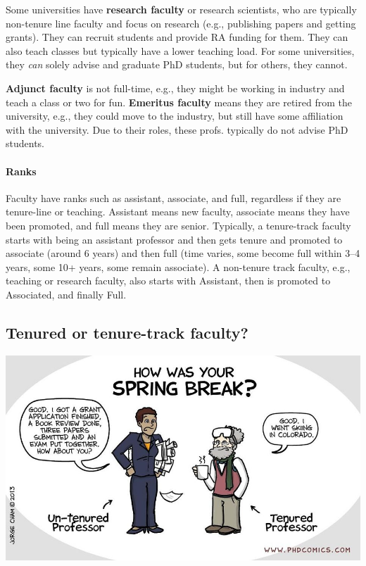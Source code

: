\documentclass[oneside,11pt,dvipsnames]{book}
\begin{document}
Some universities have \textbf{research faculty} or research scientists, who are typically non-tenure line faculty and focus on research (e.g., publishing papers and getting grants). 
They can recruit students and provide RA funding for them. 
They can also teach classes but typically have a lower teaching load.
For some universities, they \emph{can} solely advise and graduate PhD students, but for others, they cannot. 

\textbf{Adjunct faculty} is not full-time, e.g., they might be working in industry and teach a class or two for fun. \textbf{Emeritus faculty} means they are retired from the university, e.g., they could move to the industry, but still have some affiliation with the university.   Due to their roles, these profs. typically do not advise PhD students.


\paragraph{Ranks} Faculty have ranks such as assistant, associate, and full, regardless if they are tenure-line or teaching.  Assistant means new faculty, associate means they have been promoted, and full means they are senior. Typically, a tenure-track faculty starts with being an assistant professor and then gets tenure and promoted to associate (around 6 years) and then full (time varies, some become full within 3--4 years, some 10+ years, some remain associate). A non-tenure track faculty, e.g., teaching or research faculty, also starts with Assistant, then is promoted to Associated, and finally Full.




\subsection{Tenured or tenure-track faculty?}\label{sec:tenure-vs-tenure-track}

\begin{center}
  \includegraphics[scale=0.4]{files/c8.png}
\end{center}
\end{document}
